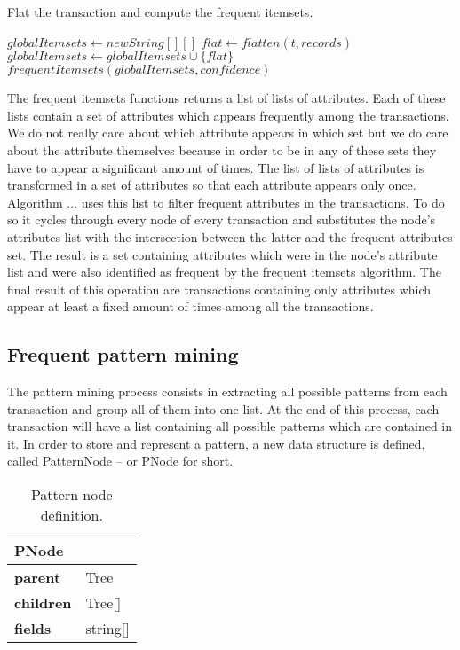 \documentclass{acm_proc_article-sp-sigmod09}
\begin{document}
\begin{algorithm}
\caption{Flat the transaction and compute the frequent itemsets.}
\label{freqitemset}
\begin{algorithmic}[1]
\State $globalItemsets \gets new String[][]$
	\State $flat \gets flatten(t, records)$
	\State $globalItemsets \gets globalItemsets \cup \{flat\}$
\EndFor
\Return $frequentItemsets(globalItemsets, confidence)$
\EndFunction
\end{algorithmic}
\end{algorithm}

The frequent itemsets functions returns a list of lists of attributes. Each of these lists contain a set of attributes which appears frequently among the transactions. We do not really care about which attribute appears in which set but we do care about the attribute themselves because in order to be in any of these sets they have to appear a significant amount of times. The list of lists of attributes is transformed in a set of attributes so that each attribute appears only once. Algorithm ... uses this list to filter frequent attributes in the transactions. To do so it cycles through every node of every transaction and substitutes the node's attributes list with the intersection between the latter and the frequent attributes set. The result is a set containing attributes which were in the node's attribute list and were also identified as frequent by the frequent itemsets algorithm. The final result of this operation are transactions containing only attributes which appear at least a fixed amount of times among all the transactions.

\subsection{Frequent pattern mining}
\label{sec:patternmining}

The pattern mining process consists in extracting all possible patterns from each transaction and group all of them into one list. At the end of this process, each transaction will have a list containing all possible patterns which are contained in it. In order to store and represent a pattern, a new data structure is defined, called PatternNode -- or PNode for short.

\begin{table}[H]
\centering
\begin{tabular}{|ll|} \hline
\textbf{PNode} & \\ \hline
\textbf{parent} & Tree \\ \hline
\textbf{children} & Tree[] \\ \hline
\textbf{fields} & string[] \\
\hline\end{tabular}
\caption{Pattern node definition.}
\label{tab:tree}
\end{table}
\end{document}
